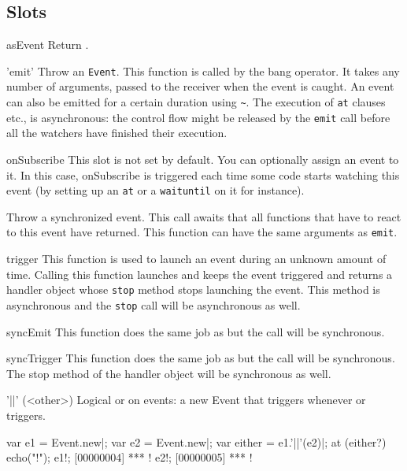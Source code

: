 \subsection{Slots}
\begin{urbiscriptapi}
\item[asEvent]
  Return \this.

\item['emit']%
  Throw an \lstinline|Event|. This function is called by the bang
  operator.  It takes any number of arguments, passed to the receiver
  when the event is caught. An event can also be emitted for a certain
  duration using \lstinline|~|.  The execution of \lstinline|at|
  clauses etc., is asynchronous: the control flow might be released by
  the \lstinline|emit| call before all the watchers have finished
  their execution.

\item[onSubscribe]
  This slot is not set by default. You can optionally assign an event
  to it. In this case, onSubscribe is triggered each time some code
  starts watching this event (by setting up an \lstinline|at| or
  a \lstinline|waituntil| on it for instance).

  Throw a synchronized event. This call awaits that all functions that
  have to react to this event have returned.  This function can have
  the same arguments as \lstinline|emit|.

\item[trigger]
  This function is used to launch an event during an unknown amount of
  time. Calling this function launches and keeps the event triggered
  and returns a handler object whose \lstinline|stop| method stops launching
  the event. This method is asynchronous and the \lstinline|stop| call
  will be asynchronous as well.

\item[syncEmit]
  This function does the same job as  but the call
  will be synchronous.

\item[syncTrigger]
  This function does the same job as  but the call
  will be synchronous. The stop method of the handler object will be
  synchronous as well.

\item['||'](<other>)%
  Logical or on events: a new Event that triggers whenever 
  or  triggers.

\begin{urbiscript}
var e1 = Event.new|;
var e2 = Event.new|;
var either = e1.'||'(e2)|;
at (either?)
  echo("!");
e1!;
[00000004] *** !
e2!;
[00000005] *** !
\end{urbiscript}


\end{urbiscriptapi}
